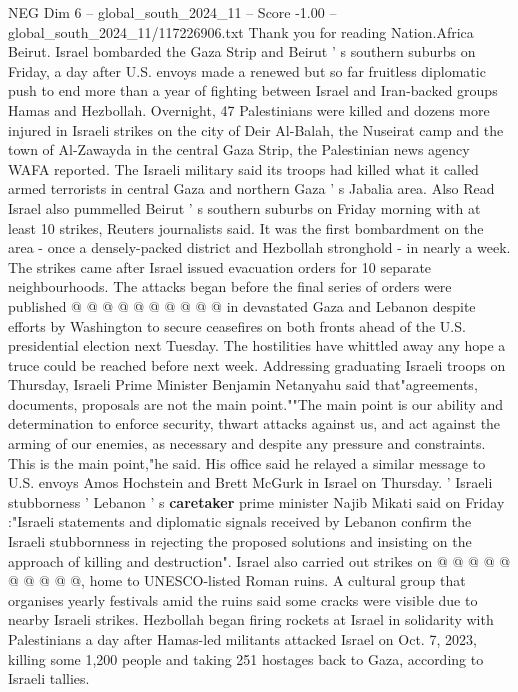 \begin{textsample}{NEG Dim 6 – global\_south\_2024\_11 – Score -1.00 – global\_south\_2024\_11/117226906.txt}  \label{ex:f6_neg_113}
Thank you for reading Nation.Africa Beirut.
Israel bombarded the Gaza Strip and Beirut ' s southern suburbs on Friday, a day after U.S. envoys made a renewed but so far fruitless diplomatic push to end more than a year of fighting between Israel and Iran-backed groups Hamas and Hezbollah.
Overnight, 47 Palestinians were killed and dozens more injured in Israeli strikes on the city of Deir Al-Balah, the Nuseirat camp and the town of Al-Zawayda in the central Gaza Strip, the Palestinian news agency WAFA reported.
The Israeli military said its troops had killed what it called armed terrorists in central Gaza and northern Gaza ' s Jabalia area.
Also Read Israel also pummelled Beirut ' s southern suburbs on Friday morning with at least 10 strikes, Reuters journalists said.
It was the first bombardment on the area - once a densely-packed district and Hezbollah stronghold - in nearly a week.
The strikes came after Israel issued evacuation orders for 10 separate neighbourhoods.
The attacks began before the final series of orders were published @ @ @ @ @ @ @ @ @ @ in devastated Gaza and Lebanon despite efforts by Washington to secure ceasefires on both fronts ahead of the U.S. presidential election next Tuesday.
The hostilities have whittled away any hope a truce could be reached before next week.
Addressing graduating Israeli troops on Thursday, Israeli Prime Minister Benjamin Netanyahu said that"agreements, documents, proposals are not the main point.""The main point is our ability and determination to enforce security, thwart attacks against us, and act against the arming of our enemies, as necessary and despite any pressure and constraints.
This is the main point,"he said.
His office said he relayed a similar message to U.S. envoys Amos Hochstein and Brett McGurk in Israel on Thursday. ' Israeli stubborness ' Lebanon ' s \textbf{caretaker} prime minister Najib Mikati said on Friday :"Israeli statements and diplomatic signals received by Lebanon confirm the Israeli stubbornness in rejecting the proposed solutions and insisting on the approach of killing and destruction".
Israel also carried out strikes on @ @ @ @ @ @ @ @ @ @, home to UNESCO-listed Roman ruins.
A cultural group that organises yearly festivals amid the ruins said some cracks were visible due to nearby Israeli strikes.
Hezbollah began firing rockets at Israel in solidarity with Palestinians a day after Hamas-led militants attacked Israel on Oct. 7, 2023, killing some 1,200 people and taking 251 hostages back to Gaza, according to Israeli tallies.

\end{textsample}

